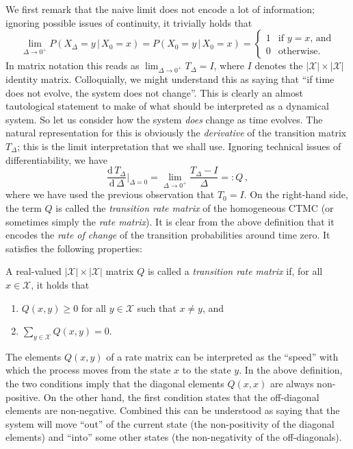 \documentclass[graybox]{svmult}
\newcommand{\states}{\mathcal{X}}
\begin{document}
We first remark that the naive limit does not encode a lot of information; ignoring possible issues of continuity, it trivially holds that
\begin{equation}\label{eq:time_zero_is_id}
\lim_{\Delta\to 0^+} P(X_{\Delta}=y\,\vert\,X_0=x) = P(X_0=y\,\vert\,X_0=x) = \begin{cases}
1 & \text{if $y=x$, and} \\
0 & \text{otherwise.}
\end{cases}
\end{equation}
In matrix notation this reads as $\lim_{\Delta\to0^+}T_\Delta = I$, where $I$ denotes the $\lvert\states\rvert\times \lvert\states\rvert$ identity matrix. Colloquially, we might understand this as saying that ``if time does not evolve, the system does not change''. This is clearly an almost tautological statement to make of what should be interpreted as a dynamical system. So let us consider how the system \emph{does} change as time evolves. The natural representation for this is obviously the \emph{derivative} of the transition matrix $T_\Delta$; this is the limit interpretation that we shall use. Ignoring technical issues of differentiability, we have
\begin{equation}\label{eq:rate_mat_is_deriv}
\frac{\mathrm{d}\,T_\Delta}{\mathrm{d}\,\Delta}\bigg\vert_{\Delta=0} = \lim_{\Delta\to0^+}\frac{T_\Delta - I}{\Delta} =: Q\,,
\end{equation}
where we have used the previous observation that $T_0=I$. On the right-hand side, the term $Q$ is called the \emph{transition rate matrix} of the homogeneous CTMC (or sometimes simply the \emph{rate matrix}). It is clear from the above definition that it encodes the \emph{rate of change} of the transition probabilities around time zero. It satisfies the following properties:
\begin{definition}\label{def:trans_rate_matrix}
A real-valued $\lvert\states\rvert\times\lvert\states\rvert$ matrix $Q$ is called a \emph{transition rate matrix} if, for all $x\in\states$, it holds that
\begin{enumerate}
\item $Q(x,y)\geq 0$ for all $y\in\states$ such that $x\neq y$, and
\item $\sum_{y\in\states}Q(x,y)=0$.
\end{enumerate}
\end{definition}
The elements $Q(x,y)$ of a rate matrix can be interpreted as the ``speed'' with which the process moves from the state $x$ to the state $y$. In the above definition, the two conditions imply that the diagonal elements $Q(x,x)$ are always non-positive. On the other hand, the first condition states that the off-diagonal elements are non-negative. Combined this can be understood as saying that the system will move ``out'' of the current state (the non-positivity of the diagonal elements) and ``into'' some other states (the non-negativity of the off-diagonals).
\end{document}
